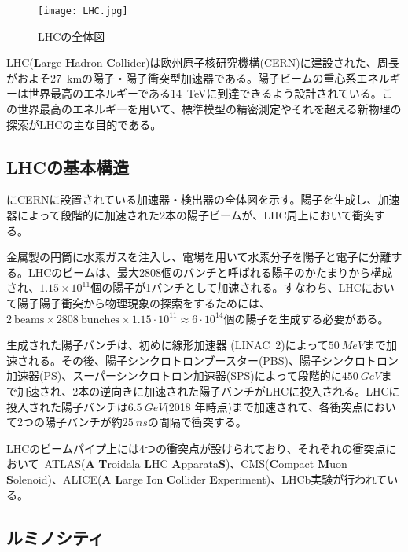 \begin{figure}[tbp]
  \centering
  \texttt{[image: LHC.jpg]}
  \caption[LHCの全体図]{LHCの全体図 \cite{LHC} }
  \label{fig:LHC}
\end{figure}


LHC(\textbf{L}arge \textbf{H}adron \textbf{C}ollider)は欧州原子核研究機構(CERN)に建設された、周長がおよそ27\ \si{km}の陽子・陽子衝突型加速器である。陽子ビームの重心系エネルギーは世界最高のエネルギーである14\ \si{TeV}に到達できるよう設計されている。この世界最高のエネルギーを用いて、標準模型の精密測定やそれを超える新物理の探索がLHCの主な目的である。

\subsection{LHCの基本構造}
にCERNに設置されている加速器・検出器の全体図を示す。陽子を生成し、加速器によって段階的に加速された2本の陽子ビームが、LHC周上において衝突する。


金属製の円筒に水素ガスを注入し、電場を用いて水素分子を陽子と電子に分離する。LHCのビームは、最大2808個のバンチと呼ばれる陽子のかたまりから構成され、$1.15\times 10^{11}$個の陽子が1バンチとして加速される。すなわち、LHCにおいて陽子陽子衝突から物理現象の探索をするためには、$2\ \mathrm{beams} \times 2808\ \mathrm{bunches}\times 1.15\cdot10^{11}\approx 6\cdot 10^{14}$個の陽子を生成する必要がある。

生成された陽子バンチは、初めに線形加速器 (LINAC\ 2)によって$50\ \si{MeV}$まで加速される。その後、陽子シンクロトロンブースター(PBS)、陽子シンクロトロン加速器(PS)、スーパーシンクロトロン加速器(SPS)によって段階的に$450\ \si{GeV}$まで加速され、2本の逆向きに加速された陽子バンチがLHCに投入される。LHCに投入された陽子バンチは$6.5\ \si{GeV}$(2018 年時点)まで加速されて、各衝突点において2つの陽子バンチが約$25\ \si{ns}$の間隔で衝突する。

LHCのビームパイプ上には4つの衝突点が設けられており、それぞれの衝突点において\ ATLAS(\textbf{A} \textbf{T}roidala \textbf{L}HC \textbf{A}pparata\textbf{S})、CMS(\textbf{C}ompact \textbf{M}uon \textbf{S}olenoid)、ALICE(\textbf{A} \textbf{L}arge \textbf{I}on \textbf{C}ollider \textbf{E}xperiment)、LHCb実験が行われている。




\subsection{ルミノシティ}
\label{sec:luminosity}

